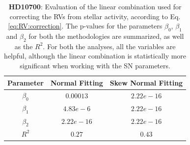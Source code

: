 \documentclass[11pt, oneside]{article}
\begin{document}
\begin{table}[!t]
\begin{tabular}{|c|c|c|}
\hline
Parameter          & Normal Fitting         &   Skew Normal Fitting \\
\hline
$\beta_{0}$            &    $0.00013$    & $2.22e-16$ \\
\hline
$\beta_{1}$            &    $4.83e-6$    & $2.22e-16$ \\
\hline
$\beta_{2}$            &     $2.22e-16$   &  $ 2.22e-16 $ \\
\hline
$R^{2}$      &     $0.27$    &  $0.43$   \\
\hline
\end{tabular}
\caption{\textbf{HD10700}: Evaluation of the linear combination used for correcting the RVs from stellar activity, according to Eq. \ref{eq:RV:correction}. The p-values for the parameters  $\beta_{0}$, $\beta_{1}$ and $\beta_{2}$ for both the methodologies are summarized, as well as the $R^2$. For both the analyses, all the variables are helpful, although the linear combination is statistically more significant when working with the SN parameters.}
\label{table:Tau:test}
\end{table}
\end{document}
